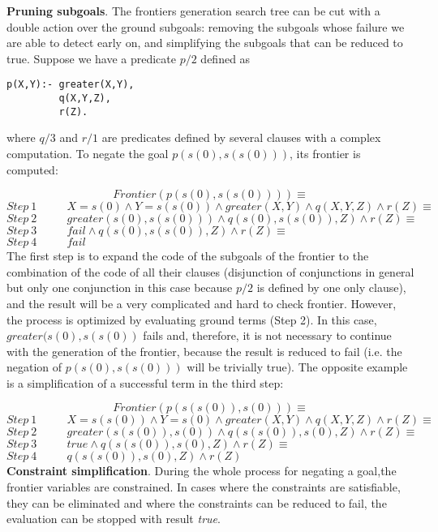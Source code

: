 \documentclass{llncs}
\begin{document}
\noindent
{\bf Pruning subgoals}. The frontiers generation search tree can be
cut with a double action over the ground subgoals: removing the
subgoals whose failure we are able to detect early on, and simplifying the
subgoals that can be reduced to true. Suppose  we have a predicate $p/2$
defined as
{\small
\begin{verbatim}
p(X,Y):- greater(X,Y),
         q(X,Y,Z),
         r(Z).
\end{verbatim}
}\noindent
where $q/3$ and $r/1$ are predicates defined by several
clauses with a complex computation. To negate
the goal $p(s(0),s(s(0)))$, its frontier is computed:

$$Frontier(p(s(0),s(s(0)))) \equiv $$
$Step~ 1~~~~~~~~~~~~{ X=s(0) \wedge Y=s(s(0)) \wedge
  greater(X,Y) \wedge q(X,Y,Z) \wedge r(Z) } \equiv $ \\
$Step~ 2~~~~~~~~~~~~{ greater(s(0),s(s(0))) \wedge q(s(0),s(s(0)),Z) \wedge r(Z) } \equiv $ \\
$Step~ 3~~~~~~~~~~~~{ fail  \wedge q(s(0),s(s(0)),Z) \wedge r(Z) } \equiv $ \\
$Step~ 4~~~~~~~~~~~~fail $ \\

The first step is to expand the code of the subgoals of the frontier
to the combination of the code of all their clauses (disjunction of
conjunctions in general but only one conjunction in this case because
$p/2$ is defined by one only clause), and the result will be a very
complicated and hard to check frontier.  However, the process is
optimized by evaluating ground terms (Step 2). In this case,
$greater(s(0),s(s(0))$ fails and, therefore, it is not necessary to
continue with the generation of the frontier, because the result is
reduced to fail (i.e. the negation of $p (s(0), s(s(0)))$ will be
trivially true). The opposite example is a simplification of a
successful term in the third step:

$$Frontier(p(s(s(0)),s(0))) \equiv $$
$Step~ 1~~~~~~~~~~~~{ X=s(s(0)) \wedge Y=s(0) \wedge greater(X,Y) \wedge q(X,Y,Z) \wedge
  r(Z) } \equiv $ \\
$Step~ 2~~~~~~~~~~~~{ greater(s(s(0)),s(0)) \wedge q(s(s(0)),s(0),Z) \wedge r(Z) } \equiv
$ \\
$Step~ 3~~~~~~~~~~~~{ true \wedge q(s(s(0)),s(0),Z) \wedge r(Z) } \equiv $ \\
$Step~ 4~~~~~~~~~~~~{ q(s(s(0)),s(0),Z) \wedge r(Z) } $ \\

\noindent
{\bf Constraint simplification}. During the whole process for negating
a goal,the frontier variables are constrained. In cases where the
constraints are satisfiable, they can be eliminated and where the
constraints can be reduced to fail, the evaluation can be stopped with
result \emph{true}.
 
\end{document}
